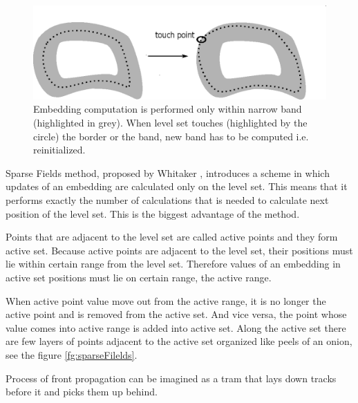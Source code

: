 \begin{figure}
    \centering
    \includegraphics[width=\textwidth]{data/narrowBands}
    \caption[Narrow band computation illustration]{Embedding computation is performed only within narrow band (highlighted in grey). When level set touches (highlighted by the circle) the border or the band, new band has to be computed i.e. reinitialized.}
    \label{fg:narrowBands}
\end{figure}

\par
Sparse Fields method, proposed by Whitaker \cite{sparseFilelds}, introduces a scheme in which updates of an embedding are calculated only on the level set.
This means that it performs exactly the number of calculations that is needed to calculate next position of the level set.
This is the biggest advantage of the method.

\par
Points that are adjacent to the level set are called active points and they form active set.
Because active points are adjacent to the level set, their positions must lie within certain range from the level set.
Therefore values of an embedding in active set positions must lie on certain range, the active range.

\par
When active point value move out from the active range, it is no longer the active point and is removed from the active set.
And vice versa, the point whose value comes into active range is added into active set.
Along the active set there are few layers of points adjacent to the active set organized like peels of an onion, see the figure \ref{fg:sparseFilelds}.

\par
Process of front propagation can be imagined as a tram that lays down tracks before it and picks them up behind.


